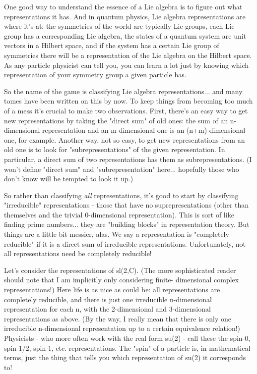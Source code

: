 One good way to understand the essence of a Lie algebra is to figure out
what representations it has.  And in quantum physics, Lie algebra
representations are where it's at: the symmetries of the world are
typically Lie groups, each Lie group has a corresponding Lie algebra,
the states of a quantum system are unit vectors in a Hilbert space, and
if the system has a certain Lie group of symmetries there will be a
representation of the Lie algebra on the Hilbert space.  As any particle
physicist can tell you, you can learn a lot just by knowing which
representation of your symmetry group a given particle has.

So the name of the game is classifying Lie algebra representations...
and many tomes have been written on this by now.  To keep things from
becoming too much of a mess it's crucial to make two observations.
First, there's an easy way to get new representations by taking the
"direct sum" of old ones: the sum of an n-dimensional representation and
an m-dimensional one is an (n+m)-dimensional one, for example.  Another
way, not so easy, to get new representations from an old one is to look for
"subrepresentations" of the given representation.  In particular, a
direct sum of two representations has them as subrepresentations.  
(I won't define "direct sum" and "subrepresentation" here... hopefully
those who don't know will be tempted to look it up.)

So rather than classifying \emph{all} representations, it's good to start by
classifying "irreducible" representations - those that have no
suprepresentations (other than themselves and the trivial 0-dimensional
representation).  This is sort of like finding prime numbers... they are
"building blocks" in representation theory.  But things are a little bit
messier, alas.  We say a representation is "completely reducible" if it
is a direct sum of irreducible representations.  Unfortunately, not all
representations need be completely reducible!  

Let's consider the representations of sl(2,C).  (The more sophisticated
reader should note that I am implicitly only considering finite-
dimensional complex representations!)   Here life is as nice as could
be: all representations are completely reducible, and
there is just one irreducible n-dimensional representation for each
n, with the 2-dimensional and 3-dimensional representations as above.  
(By the way, I really mean that there is only one irreducible
n-dimensional representation up to a certain equivalence relation!) 
Physicists - who more often work with the real form su(2) - call these
the spin-0, spin-1/2, spin-1, etc. representations.  The "spin" of a
particle is, in mathematical terms, just the thing that tells you which
representation of su(2) it corresponds to!


